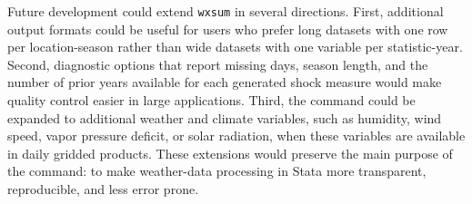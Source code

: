 Future development could extend \texttt{wxsum} in several directions. First, additional output formats could be useful for users who prefer long datasets with one row per location-season rather than wide datasets with one variable per statistic-year. Second, diagnostic options that report missing days, season length, and the number of prior years available for each generated shock measure would make quality control easier in large applications. Third, the command could be expanded to additional weather and climate variables, such as humidity, wind speed, vapor pressure deficit, or solar radiation, when these variables are available in daily gridded products. These extensions would preserve the main purpose of the command: to make weather-data processing in Stata more transparent, reproducible, and less error prone.

\endinput
